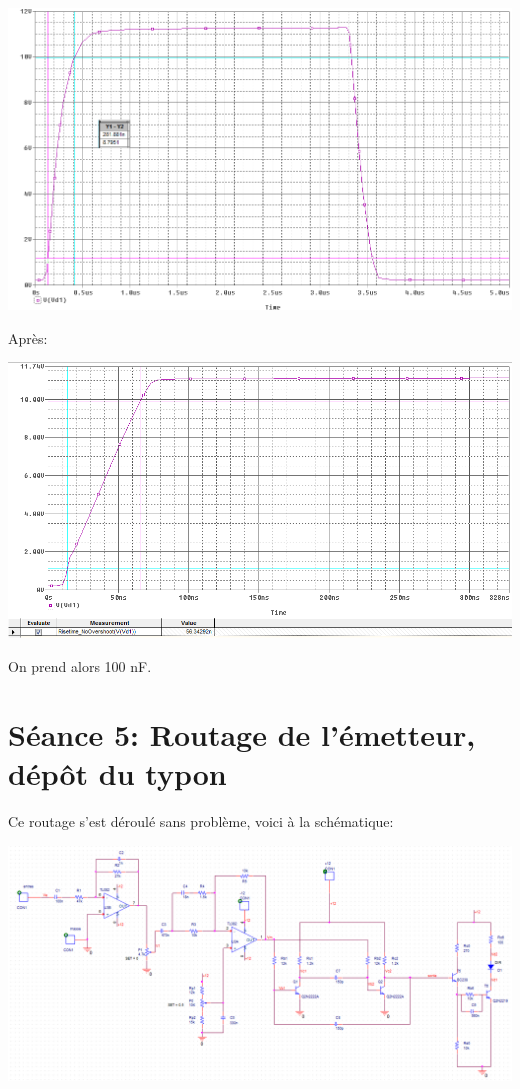 \includegraphics[width=\linewidth]{../img/simu_t_rise_del.png}

Après:

\includegraphics[width=\linewidth]{../img/simu_t_rise_del_amelioree.png}



On prend alors 100 \si{\nano\farad}.
\section{Séance 5: Routage de l’émetteur, dépôt du typon}
Ce routage s’est déroulé sans problème, voici à la schématique: 

\includegraphics[width=\linewidth]{../img/schematic_routage.png}

